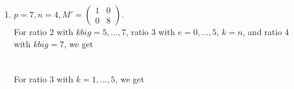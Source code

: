 \documentclass[letterpaper,12pt]{article}
\begin{document}
\begin{enumerate}
\item $p=7, n=4, M' = \begin{pmatrix}
1 & 0 \\ 0 & 8
\end{pmatrix}.$ \\
For ratio 2 with $kbig = 5, \dots, 7$, ratio 3 with $e = 0, \dots, 5$, $k=n$, and ratio 4 with $kbig = 7$, we get \\
 \\
 \\
For ratio 3 with $k = 1, \dots, 5$, we get \\
 \\

\end{enumerate}

\end{document}
